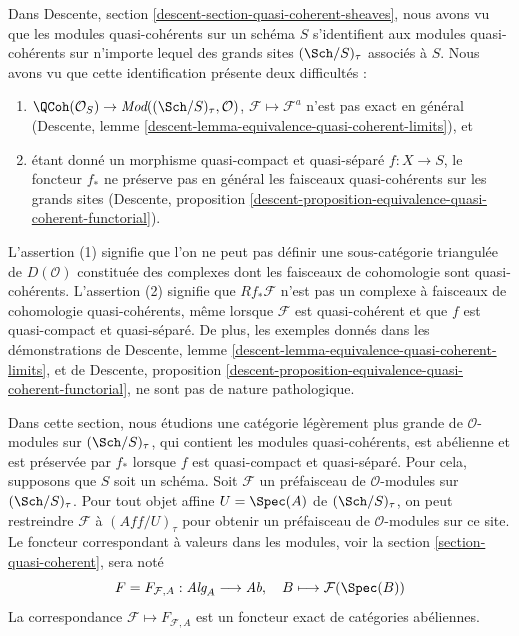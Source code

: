 \noindent
Dans
Descente, section \ref{descent-section-quasi-coherent-sheaves},
nous avons vu que les modules quasi-cohérents sur un schéma $S$
s'identifient aux modules quasi-cohérents sur n'importe lequel des grands
sites $(\Sch/S)_\tau$ associés à $S$. Nous avons vu que cette
identification présente deux difficultés :
\begin{enumerate}
\item $\QCoh(\mathcal{O}_S) \to
\textit{Mod}((\Sch/S)_\tau, \mathcal{O})$,
$\mathcal{F} \mapsto \mathcal{F}^a$ n'est pas exact en général
(Descente, lemme \ref{descent-lemma-equivalence-quasi-coherent-limits}), et
\item étant donné un morphisme quasi-compact et quasi-séparé $f : X \to S$,
le foncteur $f_*$ ne préserve pas en général les faisceaux quasi-cohérents sur les
grands sites (Descente, proposition
\ref{descent-proposition-equivalence-quasi-coherent-functorial}).
\end{enumerate}
L'assertion (1) signifie que l'on ne peut pas définir une sous-catégorie triangulée
de $D(\mathcal{O})$ constituée des complexes dont les faisceaux de cohomologie
sont quasi-cohérents. L'assertion (2) signifie que $Rf_*\mathcal{F}$ n'est pas un
complexe à faisceaux de cohomologie quasi-cohérents, même lorsque $\mathcal{F}$
est quasi-cohérent et que $f$ est quasi-compact et quasi-séparé.
De plus, les exemples donnés dans les démonstrations de
Descente, lemme
\ref{descent-lemma-equivalence-quasi-coherent-limits},
et de
Descente, proposition
\ref{descent-proposition-equivalence-quasi-coherent-functorial},
ne sont pas de nature pathologique.

\medskip\noindent
Dans cette section, nous étudions une catégorie légèrement plus grande
de $\mathcal{O}$-modules sur $(\Sch/S)_\tau$, qui contient les
modules quasi-cohérents, est abélienne et est préservée par $f_*$ lorsque
$f$ est quasi-compact et quasi-séparé.
Pour cela, supposons que $S$ soit un schéma. Soit $\mathcal{F}$ un préfaisceau
de $\mathcal{O}$-modules sur $(\Sch/S)_\tau$.
Pour tout objet affine $U = \Spec(A)$ de $(\Sch/S)_\tau$,
on peut restreindre $\mathcal{F}$ à $(\textit{Aff}/U)_\tau$ pour obtenir
un préfaisceau de $\mathcal{O}$-modules sur ce site. Le foncteur correspondant
à valeurs dans les modules, voir la
section \ref{section-quasi-coherent},
sera noté
$$
F = F_{\mathcal{F}, A} :
\textit{Alg}_A \longrightarrow \textit{Ab},
\quad
B \longmapsto \mathcal{F}(\Spec(B))
$$
La correspondance $\mathcal{F} \mapsto F_{\mathcal{F}, A}$ est un foncteur exact
de catégories abéliennes.

